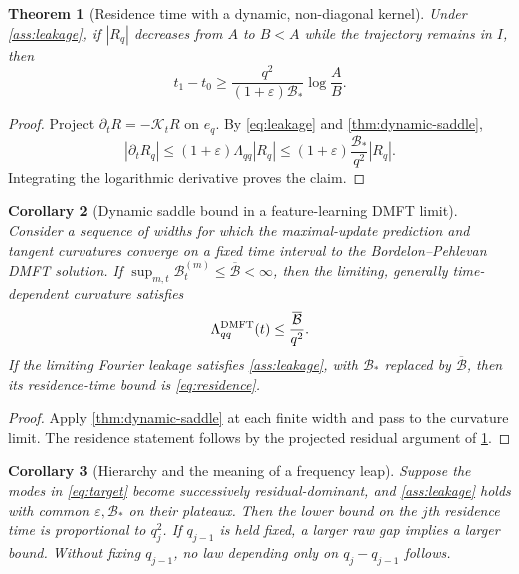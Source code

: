 \documentclass[11pt]{article}
\newcommand{\1}{\mathbf 1}
\newcommand{\cB}{\mathcal B}
\theoremstyle{plain}
\newtheorem{theorem}{Theorem}[section]
\newtheorem{corollary}[theorem]{Corollary}
\theoremstyle{definition}
\begin{document}
\begin{theorem}[Residence time with a dynamic, non-diagonal kernel]
\label{thm:residence}
Under \cref{ass:leakage}, if \(|R_q|\) decreases from \(A\) to \(B<A\)
while the trajectory remains in \(I\), then
\begin{equation}
 t_1-t_0\geq
 \frac{q^2}{(1+\varepsilon)\cB_*}\log\frac AB.
 \label{eq:residence}
\end{equation}
\end{theorem}

\begin{proof}
Project \(\partial_tR=-\mathcal K_tR\) on \(e_q\).  By
\eqref{eq:leakage} and \cref{thm:dynamic-saddle},
\[
 |\partial_tR_q|
 \leq(1+\varepsilon)\Lambda_{qq}|R_q|
 \leq(1+\varepsilon)\frac{\cB_*}{q^2}|R_q|.
\]
Integrating the logarithmic derivative proves the claim.
\end{proof}

\begin{corollary}[Dynamic saddle bound in a feature-learning DMFT limit]
\label{cor:dmft-saddle}
Consider a sequence of widths for which the maximal-update prediction and
tangent curvatures converge on a fixed time interval to the
Bordelon--Pehlevan DMFT solution.  If
\(\sup_{m,t}\cB_t^{(m)}\leq\overline{\cB}<\infty\), then the limiting,
generally time-dependent curvature satisfies
\begin{equation}
 \Lambda_{qq}^{\rm DMFT}(t)\leq\frac{\overline{\cB}}{q^2}.
 \label{eq:dmft-saddle-bound}
\end{equation}
If the limiting Fourier leakage satisfies \cref{ass:leakage}, with
\(\cB_*\) replaced by \(\overline{\cB}\), then its residence-time bound is
\eqref{eq:residence}.
\end{corollary}

\begin{proof}
Apply \cref{thm:dynamic-saddle} at each finite width and pass to the
curvature limit.  The residence statement follows by the projected residual
argument of \cref{thm:residence}.
\end{proof}

\begin{corollary}[Hierarchy and the meaning of a frequency leap]
\label{cor:hierarchy}
Suppose the modes in \eqref{eq:target} become successively residual-dominant,
and \cref{ass:leakage} holds with common \(\varepsilon,\cB_*\) on their
plateaux.  Then the lower bound on the \(j\)th residence time is proportional
to \(q_j^2\).  If \(q_{j-1}\) is held fixed, a larger raw gap implies a larger
bound.  Without fixing \(q_{j-1}\), no law depending only on
\(q_j-q_{j-1}\) follows.
\end{corollary}
\end{document}
